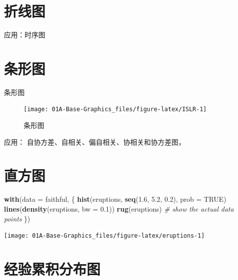 \documentclass[a4paper,oneside,UTF8]{book}
\newenvironment{Shaded}{\begin{snugshade}}{\end{snugshade}}
\newcommand{\CommentTok}[1]{\textcolor[rgb]{0.56,0.35,0.01}{\textit{#1}}}
\newcommand{\DataTypeTok}[1]{\textcolor[rgb]{0.13,0.29,0.53}{#1}}
\newcommand{\FloatTok}[1]{\textcolor[rgb]{0.00,0.00,0.81}{#1}}
\newcommand{\KeywordTok}[1]{\textcolor[rgb]{0.13,0.29,0.53}{\textbf{#1}}}
\newcommand{\NormalTok}[1]{#1}
\newcommand{\OtherTok}[1]{\textcolor[rgb]{0.56,0.35,0.01}{#1}}
\begin{document}
\hypertarget{line-chart}{%
\section{折线图}\label{line-chart}}

应用：时序图

\hypertarget{bar-chart}{%
\section{条形图}\label{bar-chart}}

条形图

\begin{figure}

{\centering \texttt{[image: 01A-Base-Graphics\_files/figure-latex/ISLR-1]} 

}

\caption{条形图}\label{fig:ISLR}
\end{figure}

应用： 自协方差、自相关、偏自相关、协相关和协方差图，

\hypertarget{hist}{%
\section{直方图}\label{hist}}

\begin{Shaded}
\begin{Highlighting}[]
\KeywordTok{with}\NormalTok{(}\DataTypeTok{data =}\NormalTok{ faithful, \{}
  \KeywordTok{hist}\NormalTok{(eruptions, }\KeywordTok{seq}\NormalTok{(}\FloatTok{1.6}\NormalTok{, }\FloatTok{5.2}\NormalTok{, }\FloatTok{0.2}\NormalTok{), }\DataTypeTok{prob =} \OtherTok{TRUE}\NormalTok{)}
  \KeywordTok{lines}\NormalTok{(}\KeywordTok{density}\NormalTok{(eruptions, }\DataTypeTok{bw =} \FloatTok{0.1}\NormalTok{))}
  \KeywordTok{rug}\NormalTok{(eruptions) }\CommentTok{# show the actual data points}
\NormalTok{\})}
\end{Highlighting}
\end{Shaded}

\begin{center}\texttt{[image: 01A-Base-Graphics\_files/figure-latex/eruptions-1]} \end{center}

\hypertarget{ecdf}{%
\section{经验累积分布图}\label{ecdf}}
\end{document}
